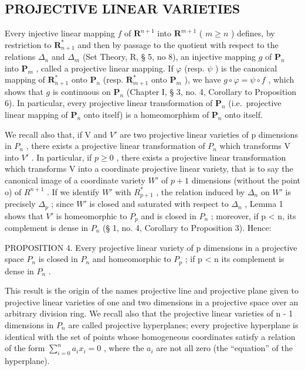 \subsection{PROJECTIVE LINEAR VARIETIES}

Every injective linear mapping \(f\) of \(\mathbf{R}^{n+1}\) into \(\mathbf{R}^{m+1}\) ( \(m \geqslant n\) ) defines, by restriction to \(\mathbf{R}_{n+1}^*\) and then by passage to the quotient with respect to the relations \(\Delta_n\) and \(\Delta_m\) (Set Theory, R, § 5, no 8), an injective mapping \(g\) of \(\mathbf{P}_n\) into \(\mathbf{P}_m\) , called a projective linear mapping. If \(\varphi\) (resp. \(\psi\) ) is the canonical mapping of \(\mathbf{R}_{n+1}^*\) onto \(\mathbf{P}_n\) (resp. \(\mathbf{R}_{m+1}^*\) onto \(\mathbf{P}_m\) ), we have \(g \circ \varphi = \psi \circ f\) , which shows that \(g\) is continuous on \(\mathbf{P}_n\) (Chapter I, § 3, no. 4, Corollary to Proposition 6). In particular, every projective linear transformation of \(\mathbf{P}_n\) (i.e.~projective linear mapping of \(\mathbf{P}_n\) onto itself) is a homeomorphism of \(\mathbf{P}_n\) onto itself.

We recall also that, if V and \(V'\) are two projective linear varieties of p dimensions in \(P_{n}\) , there exists a projective linear transformation of \(P_{n}\) which transforms V into \(V'\) . In particular, if \(p \geqslant 0\) , there exists a projective linear transformation which transforms V into a coordinate projective linear variety, that is to say the canonical image of a coordinate variety \(W'\) of \(p + 1\) dimensions (without the point o) of \(R^{n+1}\) . If we identify \(W'\) with \(R_{p+1}^{*}\) , the relation induced by \(\Delta_{n}\) on \(W'\) is precisely \(\Delta_{p}\) ; since \(W'\) is closed and saturated with respect to \(\Delta_{n}\) , Lemma 1 shows that \(V'\) is homeomorphic to \(P_{p}\) and is closed in \(P_{n}\) ; moreover, if p \textless{} n, its complement is dense in \(P_{n}\) (§ 1, no. 4, Corollary to Proposition 3). Hence:

PROPOSITION 4. Every projective linear variety of p dimensions in a projective space \(P_{n}\) is closed in \(P_{n}\) and homeomorphic to \(P_{p}\) ; if p \textless{} n its complement is dense in \(P_{n}\) .

This result is the origin of the names projective line and projective plane given to projective linear varieties of one and two dimensions in a projective space over an arbitrary division ring. We recall also that the projective linear varieties of n - 1 dimensions in \(P_{n}\) are called projective hyperplanes; every projective hyperplane is identical with the set of points whose homogeneous coordinates satisfy a relation of the form \(\sum_{i=0}^{n}a_{i}x_{i}=0\) , where the \(a_{i}\) are not all zero (the ``equation'' of the hyperplane).

